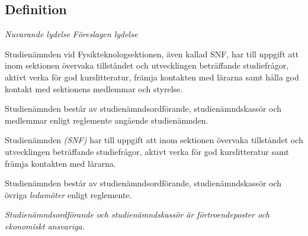 \documentclass{article}
\newenvironment{lydelse}
    {\begin{paracol}{2}%
        \emph{Nuvarande lydelse}%
        \switchcolumn%
        \emph{Föreslagen lydelse}%
    \end{paracol}%
    \begin{enumerate}[label=\thesubsection.\arabic*]%
    \begin{paracol}{2}%
    }{\end{paracol}\end{enumerate}}
\begin{document}
\subsection{Definition}
\begin{lydelse}
  \setcounter{section}{8}
  \setcounter{subsection}{1}
  \item Studienämnden vid Fysikteknologsektionen, även kallad SNF, har till uppgift att inom sektionen övervaka tillståndet och utvecklingen beträffande studiefrågor, aktivt verka för god kurslitteratur, främja kontakten med lärarna samt hålla god kontakt med sektionens medlemmar och styrelse.

  \setcounter{section}{8}
  \setcounter{subsection}{2}
  \item Studienämnden består av studienämndsordförande, studienämndskassör och medlemmar enligt reglemente angående studienämnden.
\switchcolumn
  \setcounter{section}{7}
  \item Studienämnden \emph{(SNF)} har till uppgift att inom sektionen övervaka tillståndet och utvecklingen beträffande studiefrågor, aktivt verka för god kurslitteratur samt främja kontakten med lärarna.
  
  \item Studienämnden består av studienämndsordförande, studienämndskassör och övriga \emph{ledamöter} enligt reglemente.

  \item \emph{Studienämndsordförande och studienämndskassör är förtroendeposter och ekonomiskt ansvariga.}
  \label{S:StudienamndEkonomiskt}
\end{lydelse}
\setcounter{section}{7}
\setcounter{subsection}{1}
\end{document}
